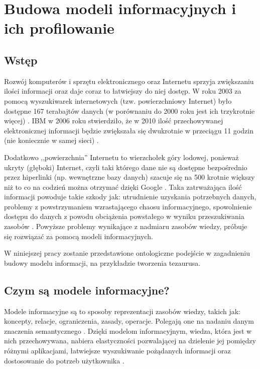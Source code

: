 
\renewcommand{\autorzy}{P. Batog, M. Pichliński}
\chapter[Budowa modeli informacyjnych i ich profilowanie]
        [Budowa modeli informacyjnych i ich profilowanie]
        {Budowa modeli informacyjnych i ich profilowanie}

\section{Wstęp}
Rozwój komputerów i sprzętu elektronicznego oraz Internetu sprzyja zwiększaniu
ilości informacji oraz daje coraz to łatwiejszy do niej dostęp. W roku 2003
za pomocą wyszukiwarek internetowych (tzw. powierzchniowy Internet)
było dostępne 167 terabajtów danych (w porównaniu do 2000 roku jest ich
trzykrotnie więcej) \cite{HowMuchInformation}.
IBM w 2006 roku stwierdziło, że w 2010 ilość przechowywanej elektronicznej
informacji będzie zwiększała się dwukrotnie w przeciągu 11 godzin 
(nie koniecznie w samej sieci) \cite{ToxicTerabyte}.

Dodatkowo ,,powierzchnia'' Internetu to wierzchołek góry lodowej, ponieważ
ukryty (głęboki) Internet, czyli taki którego dane nie są dostępne 
bezpośrednio przez hiperlinki (np. wewnętrzne bazy danych) szacuje się na 500
krotnie większy niż to co na codzień można otrzymać dzięki Google 
\cite{DeepWeb}. Taka zatrważająca ilość informacji powoduje takie szkody jak: 
utrudnienie uzyskania potrzebnych danych, problemy z powstrzymaniem
wzrastającego chaosu informacyjnego, spowolnienie dostępu do danych z powodu
obciążenia powstałego w wyniku przeszukiwania zasobów \cite{ToxicTerabyte}.
Powyższe problemy wynikające z nadmiaru zasobów wiedzy, próbuje się rozwiązać 
za pomocą modeli informacyjnych. 

W niniejszej pracy zostanie przedstawione ontologiczne podejście w zagadnieniu budowy modelu informacji, na przykładzie tworzenia tezaurusa. 

\section{Czym są modele informacyjne?}
Modele informacyjne są to sposoby reprezentacji zasobów wiedzy, takich jak:
koncepty, relacje, ograniczenia, zasady, operacje. Polegają one na nadaniu
danym znaczenia semantycznego \cite{Tina}. Dzięki modelom informacyjnym,
wiedza, która jest w nich przechowywana, nabiera elastyczności pozwalającej 
na dzielenie jej pomiędzy różnymi aplikacjami, łatwiejsze wyszukiwanie
pożądanych informacji oraz dostosowanie do potrzeb użytkownika 
\cite{GilbaneReport}.


